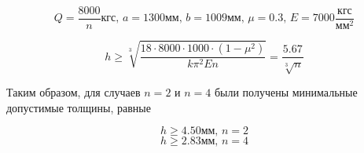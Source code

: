 \begin{equation}
Q=\frac{8000}{n}\text{кгс},\,a=1300\text{мм},\,b=1009\text{мм},\,\mu=0.3,\,E=7000\frac{\text{кгс}}{\text{мм}^2}
\end{equation}

\begin{equation}
h \geq \sqrt[3]{\frac{18\cdot8000\cdot1000\cdot(1-\mu^2)}{k\pi^2En}} = \frac{5.67}{\sqrt[3]{n}} 
\end{equation}

Таким образом, для случаев $n = 2$ и $n = 4$  были получены минимальные допустимые толщины, 
равные

\begin{equation}
h\geq4.50\text{мм},\,n=2
\end{equation}
\begin{equation}
h\geq2.83\text{мм},\,n=4
\end{equation}